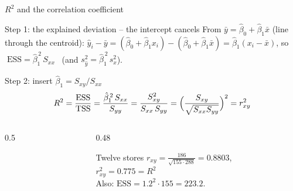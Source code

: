 \documentclass[aspectratio=169,11pt]{beamer}
\begin{document}
\begin{frame}{$R^{2}$ and the correlation coefficient}
  \begin{block}{Step 1: the explained deviation -- the intercept cancels}
    From $\bar{y} = \hat{\beta}_0 + \hat{\beta}_1 \bar{x}$ (line through the
    centroid):
    $\hat{y}_i - \bar{y} = (\hat{\beta}_0 + \hat{\beta}_1 x_i) - (\hat{\beta}_0 + \hat{\beta}_1 \bar{x})
      = \hat{\beta}_1 (x_i - \bar{x})$, so
    $\;\text{ESS} = \hat{\beta}_1^{\,2}\, S_{xx}$ \ (and
    $s_{\hat{y}}^{2} = \hat{\beta}_1^{\,2}\, s_x^{2}$).
  \end{block}

  \begin{block}{Step 2: insert $\hat{\beta}_1 = S_{xy}/S_{xx}$}
    \[
      R^{2} = \frac{\text{ESS}}{\text{TSS}}
      = \frac{\hat{\beta}_1^{\,2}\, S_{xx}}{S_{yy}}
      = \frac{S_{xy}^{2}}{S_{xx}\, S_{yy}}
      = \Bigl(\frac{S_{xy}}{\sqrt{S_{xx}S_{yy}}}\Bigr)^{2}
      = r_{xy}^{2}
    \]
    \vspace{-10pt}
  \end{block}

  \begin{columns}[T]
    \begin{column}{0.5\textwidth}
    \end{column}
    \begin{column}{0.48\textwidth}
      \begin{exampleblock}{Twelve stores}
        $r_{xy} = \frac{186}{\sqrt{155 \cdot 288}} = 0.8803$,\\
        $r_{xy}^{2} = 0.775 = R^{2}$ \checkmark \\
        Also: $\text{ESS} = 1.2^{2} \cdot 155 = 223.2$.
      \end{exampleblock}
    \end{column}
  \end{columns}
\end{frame}
\end{document}
